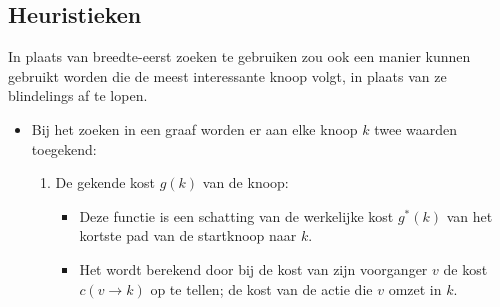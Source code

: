 \subsection{Heuristieken}
In plaats van breedte-eerst zoeken te gebruiken zou ook een manier kunnen gebruikt worden die de meest interessante knoop volgt, in plaats van ze blindelings af te lopen.
\begin{itemize}
	\item Bij het zoeken in een graaf worden er aan elke knoop $k$ twee waarden toegekend:
	\begin{enumerate}
		\item De gekende kost $g(k)$ van de knoop: 
		\begin{itemize}
			\item Deze functie is een schatting van de werkelijke kost $g^*(k)$ van het kortste  pad van de startknoop naar $k$.
			\item Het wordt berekend door bij de kost van zijn voorganger $v$ de kost $c(v \rightarrow k)$ op te tellen; de kost van de actie die $v$ omzet in $k$.


\end{itemize}
\end{enumerate}
\end{itemize}
